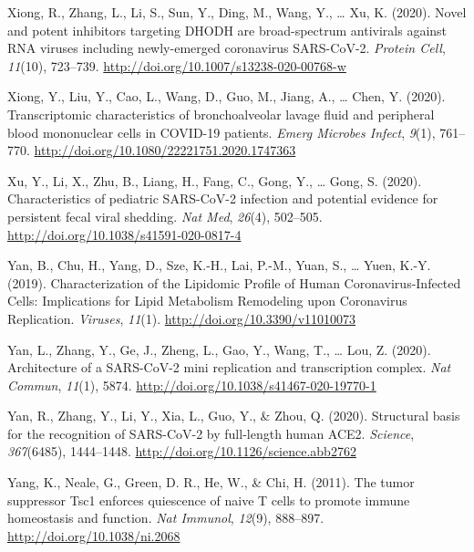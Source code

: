 \documentclass[12pt,twoside,openany,\mydriver]{thesis}  %
\begin{document}
\leavevmode\hypertarget{ref-xiong_novel_2020}{}%
Xiong, R., Zhang, L., Li, S., Sun, Y., Ding, M., Wang, Y., \ldots{} Xu, K. (2020). Novel and potent inhibitors targeting DHODH are broad-spectrum antivirals against RNA viruses including newly-emerged coronavirus SARS-CoV-2. \emph{Protein Cell}, \emph{11}(10), 723--739. \url{http://doi.org/10.1007/s13238-020-00768-w}

\leavevmode\hypertarget{ref-xiong_transcriptomic_2020}{}%
Xiong, Y., Liu, Y., Cao, L., Wang, D., Guo, M., Jiang, A., \ldots{} Chen, Y. (2020). Transcriptomic characteristics of bronchoalveolar lavage fluid and peripheral blood mononuclear cells in COVID-19 patients. \emph{Emerg Microbes Infect}, \emph{9}(1), 761--770. \url{http://doi.org/10.1080/22221751.2020.1747363}

\leavevmode\hypertarget{ref-xu_characteristics_2020}{}%
Xu, Y., Li, X., Zhu, B., Liang, H., Fang, C., Gong, Y., \ldots{} Gong, S. (2020). Characteristics of pediatric SARS-CoV-2 infection and potential evidence for persistent fecal viral shedding. \emph{Nat Med}, \emph{26}(4), 502--505. \url{http://doi.org/10.1038/s41591-020-0817-4}

\leavevmode\hypertarget{ref-yan_characterization_2019}{}%
Yan, B., Chu, H., Yang, D., Sze, K.-H., Lai, P.-M., Yuan, S., \ldots{} Yuen, K.-Y. (2019). Characterization of the Lipidomic Profile of Human Coronavirus-Infected Cells: Implications for Lipid Metabolism Remodeling upon Coronavirus Replication. \emph{Viruses}, \emph{11}(1). \url{http://doi.org/10.3390/v11010073}

\leavevmode\hypertarget{ref-yan_architecture_2020}{}%
Yan, L., Zhang, Y., Ge, J., Zheng, L., Gao, Y., Wang, T., \ldots{} Lou, Z. (2020). Architecture of a SARS-CoV-2 mini replication and transcription complex. \emph{Nat Commun}, \emph{11}(1), 5874. \url{http://doi.org/10.1038/s41467-020-19770-1}

\leavevmode\hypertarget{ref-yan_structural_2020}{}%
Yan, R., Zhang, Y., Li, Y., Xia, L., Guo, Y., \& Zhou, Q. (2020). Structural basis for the recognition of SARS-CoV-2 by full-length human ACE2. \emph{Science}, \emph{367}(6485), 1444--1448. \url{http://doi.org/10.1126/science.abb2762}

\leavevmode\hypertarget{ref-yang_tumor_2011}{}%
Yang, K., Neale, G., Green, D. R., He, W., \& Chi, H. (2011). The tumor suppressor Tsc1 enforces quiescence of naive T cells to promote immune homeostasis and function. \emph{Nat Immunol}, \emph{12}(9), 888--897. \url{http://doi.org/10.1038/ni.2068}
\end{document}
